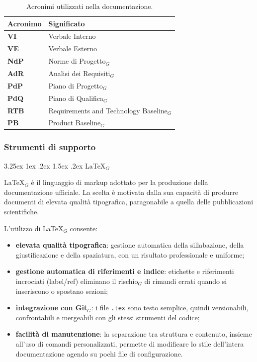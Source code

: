 \documentclass[a4paper, 10pt]{article}
\makeatletter
\renewcommand\paragraph{\@startsection{paragraph}{4}{\z@}%
  {3.25ex \@plus1ex \@minus .2ex}%
  {1.5ex \@plus .2ex}%
  {\normalfont\normalsize\bfseries}}
\makeatother
\begin{document}
\begin{table}[H]
    \centering
    \begin{tabular}{l p{10cm}}
        \textbf{Acronimo} & \textbf{Significato} \\
        \hline
        \textbf{VI} & Verbale Interno \\
        \textbf{VE} & Verbale Esterno \\
        \textbf{NdP} & Norme di Progetto$_G$ \\
        \textbf{AdR} & Analisi dei Requisiti$_G$ \\
        \textbf{PdP} & Piano di Progetto$_G$ \\
        \textbf{PdQ} & Piano di Qualifica$_G$ \\
        \textbf{RTB} & Requirements and Technology Baseline$_G$ \\
        \textbf{PB} & Product Baseline$_G$ \\
        \hline
    \end{tabular}
    \caption{Acronimi utilizzati nella documentazione.}
    \label{tab:acronimi-doc}
\end{table}

\subsubsection{Strumenti di supporto}
\label{subsec:strumenti_documentazione}

\paragraph{\LaTeX$_G$}

\LaTeX$_G$ è il linguaggio di markup adottato per la produzione della documentazione ufficiale. La scelta è motivata dalla sua capacità di produrre documenti di elevata qualità tipografica, paragonabile a quella delle pubblicazioni scientifiche.

L'utilizzo di \LaTeX$_G$ consente:
\begin{itemize}
    \item \textbf{elevata qualità tipografica}: gestione automatica della sillabazione, della giustificazione e della spaziatura, con un risultato professionale e uniforme;
    \item \textbf{gestione automatica di riferimenti e indice}: etichette e riferimenti incrociati (label/ref) eliminano il rischio$_G$ di rimandi errati quando si inseriscono o spostano sezioni;
    \item \textbf{integrazione con Git$_G$}: i file \texttt{.tex} sono testo semplice, quindi versionabili, confrontabili e mergeabili con gli stessi strumenti del codice;
    \item \textbf{facilità di manutenzione}: la separazione tra struttura e contenuto, insieme all'uso di comandi personalizzati, permette di modificare lo stile dell'intera documentazione agendo su pochi file di configurazione.
\end{itemize}
\end{document}
